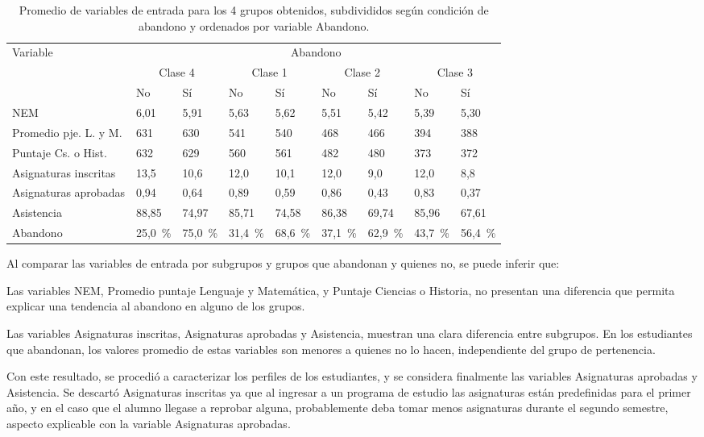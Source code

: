 \documentclass[portuguese]{textolivre}
\begin{document}
\begin{table}[htbp]
    \caption{Promedio de variables de entrada para los 4 grupos obtenidos, subdivididos según condición de abandono y ordenados por variable Abandono.}
    \label{Tabla 6}
    \centering
    \begin{tabular}{lllllllll}
    \toprule
    Variable & \multicolumn{8}{c}{Abandono}\\
     &
    \multicolumn{2}{c}{Clase 4} &
    \multicolumn{2}{c}{Clase 1} &
    \multicolumn{2}{c}{Clase 2} &
    \multicolumn{2}{c}{Clase 3}\\
     &
     No & Sí & No & Sí & No & Sí & No & Sí\\
     \midrule
     NEM & 6,01 & 5,91 & 5,63 & 5,62 & 5,51 & 5,42 & 5,39 & 5,30\\
     Promedio pje. L. y M. & 631 & 630 & 541 & 540 & 468 & 466 & 394 & 388\\
     Puntaje Cs. o Hist. &	632	& 629 &	560 & 561 & 482 & 480 & 373 & 372\\
     Asignaturas inscritas &	13,5 & 10,6 & 12,0 & 10,1 & 12,0 & 9,0 & 12,0 & 8,8\\
     Asignaturas aprobadas & 0,94 & 0,64 & 0,89 & 0,59 & 0,86 & 0,43 & 0,83 & 0,37\\
     Asistencia & 88,85 & 74,97 & 85,71 & 74,58 & 86,38 & 69,74 & 85,96 & 67,61\\
     Abandono & 25,0~\% & 75,0~\% & 31,4~\% & 68,6~\% & 37,1~\% & 62,9~\% & 43,7~\% & 56,4~\%\\
     \bottomrule
    \end{tabular}
\end{table}

Al comparar las variables de entrada por subgrupos y grupos que abandonan y quienes no, se puede inferir que:

Las variables NEM, Promedio puntaje Lenguaje y Matemática, y Puntaje Ciencias o Historia, no presentan una diferencia que permita explicar una tendencia al abandono en alguno de los grupos.

Las variables Asignaturas inscritas, Asignaturas aprobadas y Asistencia, muestran una clara diferencia entre subgrupos. En los estudiantes que abandonan, los valores promedio de estas variables son menores a quienes no lo hacen, independiente del grupo de pertenencia.

Con este resultado, se procedió a caracterizar los perfiles de los estudiantes, y se considera finalmente las variables Asignaturas aprobadas y Asistencia. Se descartó Asignaturas inscritas ya que al ingresar a un programa de estudio las asignaturas están predefinidas para el primer año, y en el caso que el alumno llegase a reprobar alguna, probablemente deba tomar menos asignaturas durante el segundo semestre, aspecto explicable con la variable Asignaturas aprobadas.
\end{document}
